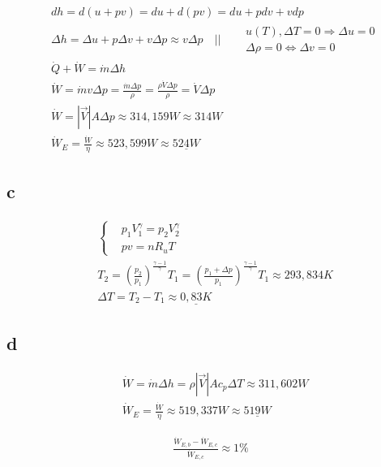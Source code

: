 \documentclass[12pt,a4paper,finnish]{article}
\begin{document}
\begin{align}
 &dh = d(u + pv) = du + d(pv) = du + pdv + vdp\\
 &\Delta h = \Delta u + p\Delta v + v\Delta p \approx v\Delta p \quad \bigg|\bigg| \quad
  \begin{aligned}
   &u(T), \Delta T = 0 \Rightarrow \Delta u = 0\\
   &\Delta\rho = 0 \Leftrightarrow \Delta v = 0
  \end{aligned}
  \\
 &\dot{Q} + \dot{W} = \dot{m}\Delta h\\
 &\dot{W} = \dot{m}v\Delta p = \frac{\dot{m}\Delta p}{\rho} = \frac{\rho\dot{V}\Delta p}{\rho}
  = \dot{V}\Delta p\\
 &\dot{W} = |\vec{V}|A\Delta p \approx 314,159 W \approx 314 W\\
 &\dot{W}_E = \frac{\dot{W}}{\eta} \approx 523,599 W \approx \underline{524 W}
\end{align}

\subsection{c}
\begin{align}
 &\left\{
 \begin{aligned}
  &p_1V^\gamma_1 = p_2V^\gamma_2\\
  &pv = nR_uT
 \end{aligned}\right.\\
 &T_2 = \left(\frac{p_2}{p_1}\right)^{\frac{\gamma - 1}{\gamma}}T_1 = 
  \left(\frac{p_1 + \Delta p}{p_1}\right)^{\frac{\gamma - 1}{\gamma}}T_1 \approx 293,834 K\\
 &\Delta T = T_2 - T_1 \approx \underline{0,83K}
\end{align}

\subsection{d}
\begin{align}
 &\dot{W} = \dot{m}\Delta h = \rho|\vec{V}|Ac_p\Delta T \approx 311,602W\\
 &\dot{W}_E = \frac{\dot{W}}{\eta} \approx 519,337 W \approx \underline{519 W}
\end{align}

\begin{align}
 \frac{\dot{W}_{E, b} - \dot{W}_{E, c}}{\dot{W}_{E, c}} \approx 1\%
\end{align}
\end{document}
